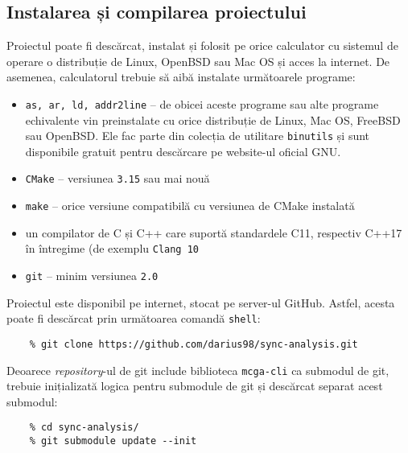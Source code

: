 \subsection{Instalarea și compilarea proiectului}
Proiectul poate fi descărcat, instalat și folosit pe orice calculator cu
sistemul de operare o distribuție de Linux, OpenBSD sau Mac OS și acces
la internet. De asemenea, calculatorul trebuie să aibă instalate
următoarele programe:
\begin{itemize}
    \item \lstinline{as, ar, ld, addr2line} -- de obicei aceste programe
    sau alte programe echivalente vin preinstalate cu orice distribuție
    de Linux, Mac OS, FreeBSD sau OpenBSD. Ele fac parte din colecția de
    utilitare \lstinline{binutils}\cite{binutils} și sunt disponibile
    gratuit pentru descărcare pe website-ul oficial
    GNU\cite{GNUWebsite}.
    \item \lstinline{CMake}\cite{CMake} -- versiunea \lstinline{3.15}
    sau mai nouă
    \item \lstinline{make} -- orice versiune compatibilă cu versiunea de
    CMake instalată
    \item un compilator de C și C++ care suportă standardele C11,
    respectiv C++17 în întregime (de exemplu \lstinline{Clang 10}
    \item \lstinline{git}\cite{git} -- minim versiunea \lstinline{2.0}
\end{itemize}

Proiectul este disponibil pe internet, stocat pe server-ul GitHub.
Astfel, acesta poate fi descărcat prin următoarea comandă
\lstinline{shell}:

\begin{minipage}{\linewidth}
\begin{lstlisting}
    % git clone https://github.com/darius98/sync-analysis.git
\end{lstlisting}
\end{minipage}

Deoarece \textit{repository}-ul de git include biblioteca
\lstinline{mcga-cli}\cite{mcga-cli} ca submodul de git, trebuie
inițializată logica pentru submodule de git și descărcat separat acest
submodul:

\begin{minipage}{\linewidth}
\begin{lstlisting}
    % cd sync-analysis/
    % git submodule update --init
\end{lstlisting}
\end{minipage}


